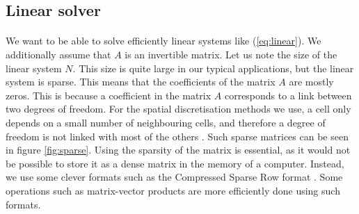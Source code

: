     \subsection{Linear solver}

      \paragraph{}
      We want to be able to solve efficiently linear systems like (\ref{eq:linear}).
      We additionally assume that $A$ is an invertible matrix.
      Let us note the size of the linear system $N$.
      This size is quite large in our typical applications, but the linear system is sparse.
      This means that the coefficients of the matrix $A$ are mostly zeros.
      This is because a coefficient in the matrix $A$ corresponds to a link between two degrees of freedom.
      For the spatial discretisation methods we use, a cell only depends on a small number of neighbouring cells, and therefore a degree of freedom is not linked with most of the others .
      Such sparse matrices can be seen in figure \ref{fig:sparse}.
      Using the sparsity of the matrix is essential, as it would not be possible to store it as a dense matrix in the memory of a computer.
      Instead, we use some clever formats such as the Compressed Sparse Row format \cite{Saad2003}.
      Some operations such as matrix-vector products are more efficiently done using such formats.


